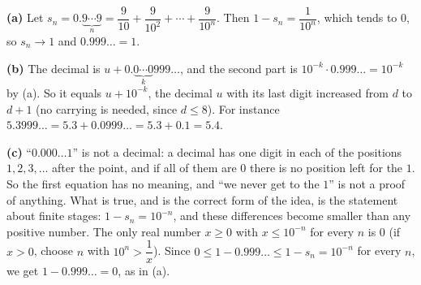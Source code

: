 \textbf{(a)} Let $s_n=0.\underbrace{9\cdots9}_{n}=\dfrac{9}{10}+\dfrac{9}{10^2}+\cdots+\dfrac{9}{10^n}$. Then $1-s_n=\dfrac{1}{10^n}$, which tends to $0$, so $s_n\to1$ and $0.999\ldots=1$.

\textbf{(b)} The decimal is $u+0.\underbrace{0\cdots0}_{k}999\ldots$, and the second part is $10^{-k}\cdot0.999\ldots=10^{-k}$ by (a). So it equals $u+10^{-k}$, the decimal $u$ with its last digit increased from $d$ to $d+1$ (no carrying is needed, since $d\le8$). For instance $5.3999\ldots=5.3+0.0999\ldots=5.3+0.1=5.4$.

\textbf{(c)} ``$0.000\ldots1$'' is not a decimal: a decimal has one digit in each of the positions $1,2,3,\dots$ after the point, and if all of them are $0$ there is no position left for the $1$. So the first equation has no meaning, and ``we never get to the $1$'' is not a proof of anything. What is true, and is the correct form of the idea, is the statement about finite stages: $1-s_n=10^{-n}$, and these differences become smaller than any positive number. The only real number $x\ge0$ with $x\le10^{-n}$ for every $n$ is $0$ (if $x>0$, choose $n$ with $10^n>\dfrac{1}{x}$). Since $0\le1-0.999\ldots\le1-s_n=10^{-n}$ for every $n$, we get $1-0.999\ldots=0$, as in (a).
